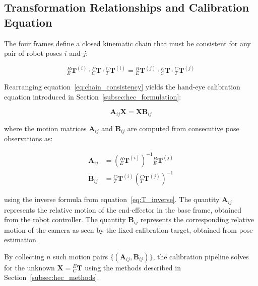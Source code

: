 \subsection{Transformation Relationships and Calibration Equation}
\label{subsec:frame_relationships}

The four frames define a closed kinematic chain that must be consistent for any
pair of robot poses $i$ and $j$:

\begin{equation}
    {}^B_E\mathbf{T}^{(i)} \cdot {}^E_C\mathbf{T} \cdot {}^C_T\mathbf{T}^{(i)}
    =
    {}^B_E\mathbf{T}^{(j)} \cdot {}^E_C\mathbf{T} \cdot {}^C_T\mathbf{T}^{(j)}
    \label{eq:chain_consistency}
\end{equation}

\noindent Rearranging equation~\eqref{eq:chain_consistency} yields the
hand-eye calibration equation introduced in Section~\ref{subsec:hec_formulation}:

\begin{equation}
    \mathbf{A}_{ij} \mathbf{X} = \mathbf{X} \mathbf{B}_{ij}
    \label{eq:axb_frames}
\end{equation}

\noindent where the motion matrices $\mathbf{A}_{ij}$ and $\mathbf{B}_{ij}$
are computed from consecutive pose observations as:

\begin{align}
    \mathbf{A}_{ij} &=
    \left({}^B_E\mathbf{T}^{(i)}\right)^{-1}
    {}^B_E\mathbf{T}^{(j)}
    \label{eq:A_ij} \\[4pt]
    \mathbf{B}_{ij} &=
    {}^C_T\mathbf{T}^{(i)}
    \left({}^C_T\mathbf{T}^{(j)}\right)^{-1}
    \label{eq:B_ij}
\end{align}

\noindent using the inverse formula from equation~\eqref{eq:T_inverse}.
The quantity $\mathbf{A}_{ij}$ represents the relative motion of the
end-effector in the base frame, obtained from the robot controller.
The quantity $\mathbf{B}_{ij}$ represents the corresponding relative motion
of the camera as seen by the fixed calibration target, obtained from
pose estimation.

By collecting $n$ such motion pairs $\{(\mathbf{A}_{ij},
\mathbf{B}_{ij})\}$, the calibration pipeline solves for the unknown
$\mathbf{X} = {}^E_C\mathbf{T}$ using the methods described in
Section~\ref{subsec:hec_methods}.

